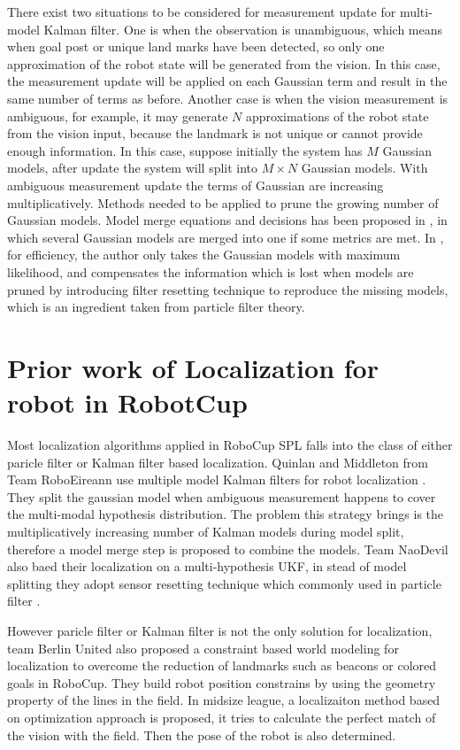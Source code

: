 There exist two situations to be considered for measurement update for multi-model Kalman filter. One is when the observation is unambiguous, which means when goal post or unique land marks have been detected, so only one approximation of the robot state will be generated from the vision. In this case, the measurement update will be applied on each Gaussian term and result in the same number of terms as before. Another case is when the vision measurement is ambiguous, for example, it may generate $N$ approximations of the robot state from the vision input, because the landmark is not unique or cannot provide enough information. In this case, suppose initially the system has $M$ Gaussian models, after update the system will split into $M \times N$ Gaussian models. With ambiguous measurement update the terms of Gaussian are increasing multiplicatively. Methods needed to be applied to prune the growing number of Gaussian models. Model merge equations and decisions has been proposed in \cite{Quinlan2010}, in which several Gaussian models are merged into one if some metrics are met. In \cite{Jochmann2012}, for efficiency, the author only takes the Gaussian models with maximum likelihood, and compensates the information which is lost when models are pruned by introducing filter resetting technique to reproduce the missing models, which is an ingredient taken from particle filter theory.

\section{Prior work of Localization for robot in RobotCup}\label{sec:2.2}
Most localization algorithms applied in RoboCup \gls{SPL} falls into the class of either paricle filter or Kalman filter based localization. Quinlan and Middleton from Team RoboEireann use multiple model Kalman filters for robot localization \cite{Quinlan2010}. They split the gaussian model when ambiguous measurement happens to cover the multi-modal hypothesis distribution. The problem this strategy brings is the multiplicatively increasing number of Kalman models during model split, therefore a model merge step is proposed to combine the models. Team NaoDevil also baed their localization on a multi-hypothesis \gls{UKF}, in stead of model splitting they adopt sensor resetting technique which commonly used in particle filter \cite{Jochmann2012}. 

However paricle filter or Kalman filter is not the only solution for localization, team Berlin United also proposed a constraint based world modeling for localization \cite{Gohring2009} to overcome the reduction of landmarks such as beacons or colored goals in RoboCup. They build robot position constrains by using the geometry property of the lines in the field. In midsize league, a localizaiton method based on optimization approach \cite{Lauer2006} is proposed, it tries to calculate the perfect match of the vision with the field. Then the pose of the robot is also determined.
